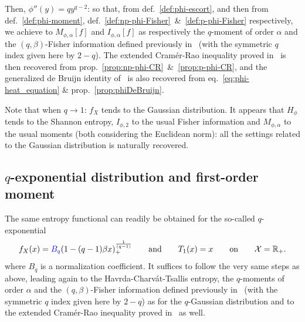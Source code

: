 \documentclass[entropy,article,submit,moreauthors,pdftex]{Definitions/mdpi}
\newcommand{\SZ}[1]{{\color{blue} #1}}                                       %
\def\Rset{\mathbb{R}}%
\def\X{\mathcal{X}}%
\begin{document}
Then, $\phi''(y) = q y^{q-2}$:  \SZ{so that, from def.~\ref{def:phi-escort}, and
  then                      from                      def.~\ref{def:phi-moment},
  def.~\ref{def:np-phi-Fisher}~\&~\ref{def:p-phi-Fisher}     respectively,    we
  achieve to $M_{\phi,\alpha}[f]$ and  $I_{\phi,\alpha}[f]$ as} respectively the
$q$-moment  of order  $\alpha$  and the  $(q,\beta)$-Fisher information  defined
previously in~\cite{LutYan05, LutYan07,  LutLv12, Ber12:06_1, Ber12:06_2, Ber13}
(with the  symmetric $q$ index given  here by $2-q$). The  extended Cram\'er-Rao
inequality  proved  in~\cite{LutYan05,  Ber12:06_2,  Ber13}  is  then  recovered
\SZ{from prop.~\ref{prop:np-phi-CR}~\&~\ref{prop:p-phi-CR},  and the generalized
  de    Bruijn   identity    of~\cite{Ber13:08}   is    also   recovered    from
  eq.~\eqref{eq:phi-heat_equation} \& prop.~\ref{prop:phiDeBruijn}.}

Note that when $q  \to 1$: $f_X$ tends to the  Gaussian distribution. It appears
that $H_\phi$  tends to the  Shannon entropy,  $I_{\phi,2}$ to the  usual Fisher
information and  $M_{\phi,\alpha}$ to  the usual  moments (both  considering the
Euclidean  norm): all  the  settings  related to  the  Gaussian distribution  is
naturally recovered.




\subsection{$q$-exponential distribution and first-order moment}
\label{subsecapp:qExponentialFirstOrder}

The  same  entropy  functional  can   readily  be  obtained  for  the  so-called
$q$-exponential
% 
\[
f_X(x)  =  \SZ{B_q} \left(  1  -  (q-1)  \beta x  \right)_+^{\frac{1}{(q-1)}}  \qquad
\mbox{and} \qquad T_1(x) = x \qquad \mbox{on} \qquad \X = \Rset_+.
\]
%
\SZ{where $B_q$ is a normalization coefficient.}  It suffices to follow the very
same steps as above, leading  again to the Havrda-Charv\'at-Tsallis entropy, the
$q$-moments  of order  $\alpha$ and  the $(q,\beta)$-Fisher  information defined
previously in~\cite{LutYan05, LutYan07,  LutLv12, Ber12:06_1, Ber12:06_2, Ber13}
(with  the symmetric  $q$ index  given here  by $2-q$)  as for  the $q$-Gaussian
distribution   and    to   the    extended   Cram\'er-Rao    inequality   proved
in~\cite{Ber12:06_2, Ber13} as well.
\end{document}
